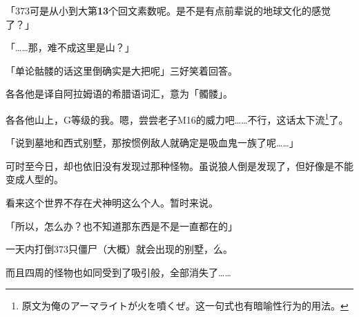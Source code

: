 「373可是从小到大第\textbf{13}个回文素数呢。是不是有点前辈说的地球文化的感觉了？」

「……那，难不成这里是山？」

「单论骷髅的话这里倒确实是大把呢」三好笑着回答。

各各他是译自阿拉姆语的希腊语词汇，意为「髑髅」。

各各他山上，G等级的我。嗯，尝尝老子M16的威力吧……不行，这话太下流\footnote{原文为俺のアーマライトが火を噴くぜ。这一句式也有暗喻性行为的用法。}了。

「说到墓地和西式别墅，那按惯例敌人就确定是吸血鬼一族了呢……」

可时至今日，却也依旧没有发现过那种怪物。虽说狼人倒是发现了，但好像是不能变成人型的。

看来这个世界不存在犬神明这么个人。暂时来说。

「所以，怎么办？也不知道那东西是不是一直都在的」

一天内打倒373只僵尸（大概）就会出现的别墅，么。

而且四周的怪物也如同受到了吸引般，全部消失了……

